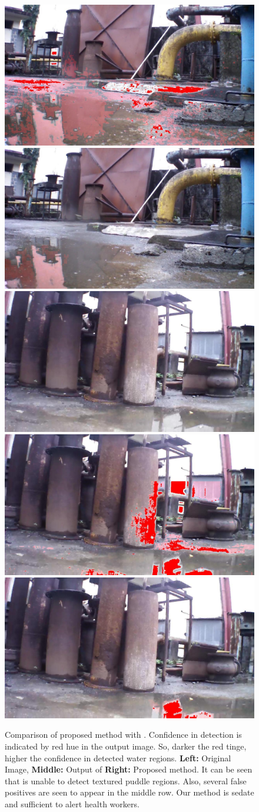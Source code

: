 \begin{figure}[p]
  \includegraphics[width=0.32\linewidth]{figures/stagnantWater/results/dataset_82/output_192_jpl2.jpg} \hfill
  \includegraphics[width=0.32\linewidth]{figures/stagnantWater/results/dataset_82/output_192.jpg} \\
\medskip
  \includegraphics[width=0.32\linewidth]{figures/stagnantWater/results/dataset_83/IMG_PAIR_130_1.jpg} \hfill
  \includegraphics[width=0.32\linewidth]{figures/stagnantWater/results/dataset_83/output_130_jpl2.jpg} \hfill
  \includegraphics[width=0.32\linewidth]{figures/stagnantWater/results/dataset_83/output_130.jpg}
	
  \caption[Result Comparison]{Comparison of proposed method with
  \cite{rankin2004daytime}.
  Confidence in detection is indicated by red hue in the output image.
So, darker the red tinge, higher the confidence in detected water regions. \textbf{Left:} Original Image,
    \textbf{Middle:} Output of \cite{rankin2004daytime} \textbf{Right:}
    Proposed method. It can be seen that \cite{rankin2004daytime} is unable to
    detect textured puddle regions. Also, several false positives are
    seen to appear in the middle row.  Our method is sedate and
    sufficient to alert health workers.}
\label{fig:comparison}
\end{figure}
 
